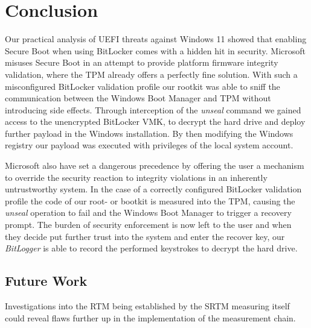 
\chapter{Conclusion}

Our practical analysis of \ac{UEFI} threats against Windows 11 showed that enabling Secure Boot when using BitLocker comes with a hidden hit in security.
Microsoft misuses Secure Boot in an attempt to provide platform firmware integrity validation, where the \ac{TPM} already offers a perfectly fine solution.
With such a misconfigured BitLocker validation profile our rootkit was able to sniff the communication between the Windows Boot Manager and \ac{TPM} without introducing side effects.
Through interception of the \emph{unseal} command we gained access to the unencrypted BitLocker \ac{VMK}, to decrypt the hard drive and deploy further payload in the Windows installation.
By then modifying the Windows registry our payload was executed with privileges of the local system account.

Microsoft also have set a dangerous precedence by offering the user a mechanism to override the security reaction to integrity violations in an inherently untrustworthy system.
In the case of a correctly configured BitLocker validation profile the code of our root- or bootkit is measured into the \ac{TPM}, causing the \emph{unseal} operation to fail and the Windows Boot Manager to trigger a recovery prompt.
The burden of security enforcement is now left to the user and when they decide put further trust into the system and enter the recover key, our \emph{BitLogger} is able to record the performed keystrokes to decrypt the hard drive.

\section*{Future Work}

Investigations into the \ac{RTM} being established by the \ac{SRTM} measuring itself could reveal flaws further up in the implementation of the measurement chain.